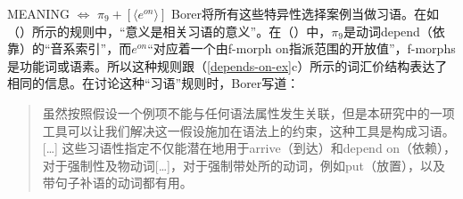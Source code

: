 \begin{exe}
\begin{xlist}[iv.]
\begin{exe}
\begin{xlist}[iv.]
\ea
MEANING $\Leftrightarrow$ $\pi_9 + [ \langle e^{on} \rangle ]$  
\z
Borer将所有这些特异性选择案例当做习语。在如（）所示的规则中，“意义是相关习语的意义”\citep[Vol.\ II, p.\,27]{Borer2005a-u}。在（）中，$\pi_9$是动词depend（依靠）的“音系索引”，而$e^{on}$“对应着一个由f-morph on指派范围的开放值”\citep[Vol.\ II, p.\,29]{Borer2005a-u}，f-morphs是功能词或语素。所以这种规则跟（\ref{depends-on-ex}c）所示的词汇价结构表达了相同的信息。在讨论这种“习语”规则时，Borer写道：

\begin{quote}
虽然按照假设一个例项不能与任何语法属性发生关联，但是本研究中的一项工具可以让我们解决这一假设施加在语法上的约束，这种工具是构成习语。 [\ldots] 这些习语性指定不仅能潜在地用于arrive（到达）和depend on（依赖），对于强制性及物动词[\ldots]，对于强制带处所的动词，例如put（放置），以及带句子补语的动词都有用。


\end{quote}
\end{xlist}
\end{exe}
\end{xlist}
\end{exe}
